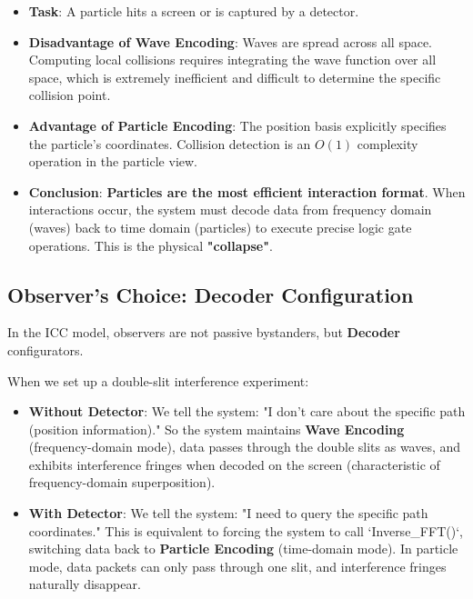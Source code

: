\begin{itemize}
\item \textbf{Task}: A particle hits a screen or is captured by a detector.

\item \textbf{Disadvantage of Wave Encoding}: Waves are spread across all space. Computing local collisions requires integrating the wave function over all space, which is extremely inefficient and difficult to determine the specific collision point.

\item \textbf{Advantage of Particle Encoding}: The position basis explicitly specifies the particle's coordinates. Collision detection is an $O(1)$ complexity operation in the particle view.

\item \textbf{Conclusion}: \textbf{Particles are the most efficient interaction format}. When interactions occur, the system must decode data from frequency domain (waves) back to time domain (particles) to execute precise logic gate operations. This is the physical \textbf{"collapse"}.
\end{itemize}

\subsection{Observer's Choice: Decoder Configuration}

In the ICC model, observers are not passive bystanders, but \textbf{Decoder} configurators.

When we set up a double-slit interference experiment:

\begin{itemize}
\item \textbf{Without Detector}: We tell the system: "I don't care about the specific path (position information)." So the system maintains \textbf{Wave Encoding} (frequency-domain mode), data passes through the double slits as waves, and exhibits interference fringes when decoded on the screen (characteristic of frequency-domain superposition).

\item \textbf{With Detector}: We tell the system: "I need to query the specific path coordinates." This is equivalent to forcing the system to call `Inverse_FFT()`, switching data back to \textbf{Particle Encoding} (time-domain mode). In particle mode, data packets can only pass through one slit, and interference fringes naturally disappear.
\end{itemize}

